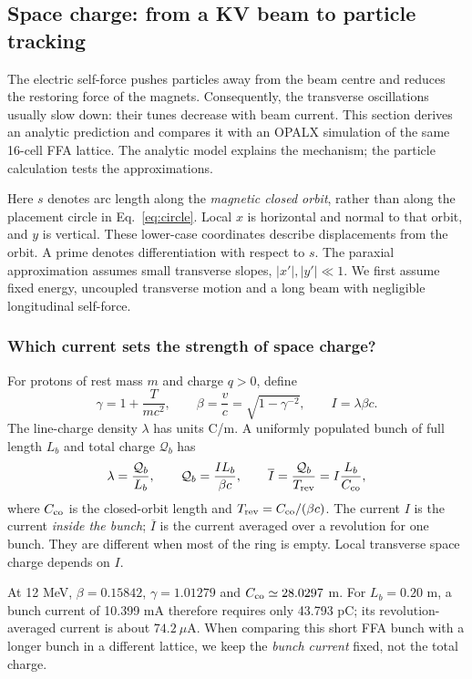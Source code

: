 \subsection{Space charge: from a KV beam to particle tracking}
\label{sec:space-charge}
The electric self-force pushes particles away from
the beam centre and reduces the restoring force of the magnets. Consequently,
the transverse oscillations usually slow down: their tunes decrease with beam
current. This section derives an analytic prediction and compares it with an
OPALX simulation of the same 16-cell FFA lattice. The analytic model explains the
mechanism; the particle calculation tests the approximations.

Here $s$ denotes arc length along the \emph{magnetic closed orbit}, rather than
along the placement circle in Eq.~\eqref{eq:circle}. Local $x$ is horizontal and
normal to that orbit, and $y$ is vertical. These lower-case coordinates describe
displacements from the orbit. A prime denotes differentiation with respect to
$s$. The paraxial approximation assumes small transverse slopes, $|x'|,|y'|\ll1$.
We first assume fixed energy, uncoupled transverse motion and a long beam with
negligible longitudinal self-force.

\subsubsection{Which current sets the strength of space charge?}
For protons of rest mass $m$ and charge $q>0$, define
\begin{equation}
 \gamma=1+\frac{T}{mc^2},\qquad
 \beta=\frac{v}{c}=\sqrt{1-\gamma^{-2}},\qquad
 I=\lambda\beta c.
 \label{eq:sc-current}
\end{equation}
The line-charge density $\lambda$ has units C/m. A uniformly populated bunch
of full length $L_b$ and total charge $\mathcal Q_b$ has
\begin{equation}
 \lambda=\frac{\mathcal Q_b}{L_b},\qquad
 \mathcal Q_b=\frac{I L_b}{\beta c},\qquad
 \overline I=\frac{\mathcal Q_b}{T_{\rm rev}}
            =I\frac{L_b}{C_{\rm co}},
 \label{eq:sc-bunch-charge}
\end{equation}
where $C_{\rm co}$ is the closed-orbit length and $T_{\rm rev}=C_{\rm co}/(\beta c)$.
The current $I$ is the current \emph{inside the bunch}; $\overline I$ is the
current averaged over a revolution for one bunch. They are different when
most of the ring is empty. Local transverse space charge depends on $I$.

At 12 MeV, $\beta=0.15842$, $\gamma=1.01279$ and
$C_{\rm co}\simeq28.0297$ m. For $L_b=0.20$ m, a bunch current of 10.399 mA
therefore requires only 43.793 pC; its revolution-averaged current is about
$74.2\ \mu$A. When comparing this short FFA bunch with a longer bunch in a
different lattice, we keep the \emph{bunch current} fixed, not the total charge.


